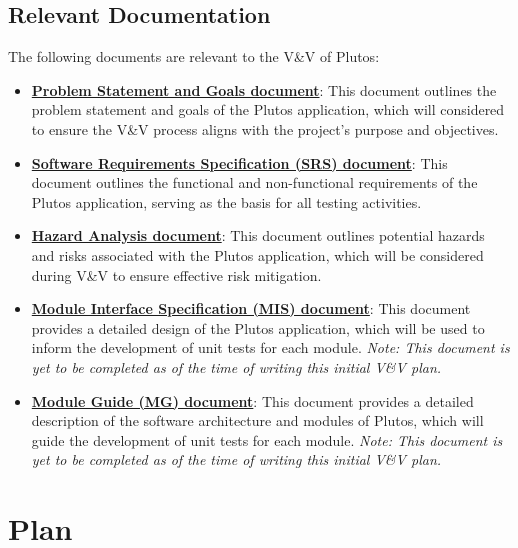 \documentclass[12pt, titlepage]{article}
\begin{document}
\subsection{Relevant Documentation}

The following documents are relevant to the V\&V of Plutos:
\begin{itemize}
	\item
	\href{https://github.com/PlutosCapstone/Plutos/blob/main/docs/ProblemStatementAndGoals/ProblemStatement.pdf}{\textbf{Problem
	Statement and Goals document}}: This document outlines the problem statement
	and goals of the Plutos application, which will considered to ensure the
	V\&V process aligns with the project's purpose and objectives.
	\item
	\href{https://github.com/PlutosCapstone/Plutos/blob/main/docs/SRS/SRS.pdf}{\textbf{Software
	Requirements Specification (SRS) document}}: This document outlines the
	functional and non-functional requirements of the Plutos application,
	serving as the basis for all testing activities.
	\item
	\href{https://github.com/PlutosCapstone/Plutos/blob/main/docs/HazardAnalysis/HazardAnalysis.pdf}{\textbf{Hazard
	Analysis document}}: This document outlines potential hazards and risks
	associated with the Plutos application, which will be considered during V\&V
	to ensure effective risk mitigation.
	\item
	\href{https://github.com/PlutosCapstone/Plutos/blob/main/docs/Design/SoftDetailedDes/MIS.pdf}{\textbf{Module
	Interface Specification (MIS) document}}: This document provides a detailed
	design of the Plutos application, which will be used to inform the
	development of unit tests for each module. \textit{Note: This document is
	yet to be completed as of the time of writing this initial V\&V plan.}
	\item
	\href{https://github.com/PlutosCapstone/Plutos/blob/main/docs/Design/SoftArchitecture/MG.pdf}{\textbf{Module
	Guide (MG) document}}: This document provides a detailed description of the
	software architecture and modules of Plutos, which will guide the
	development of unit tests for each module. \textit{Note: This document is
	yet to be completed as of the time of writing this initial V\&V plan.}
\end{itemize}

\newpage

\section{Plan}
\end{document}
